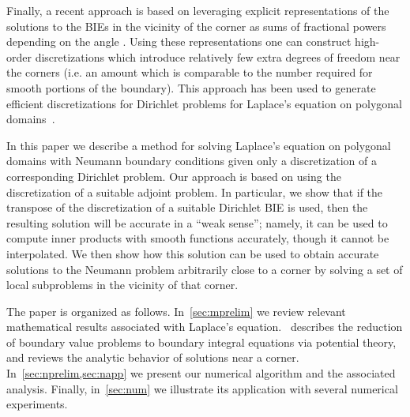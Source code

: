  Finally, a recent approach is based on leveraging explicit representations of the solutions to the BIEs in the vicinity of the corner as sums of fractional powers depending on the angle \cite{serkhacha,serkh2016solution}. Using these representations one can construct high-order discretizations which introduce relatively few extra degrees of freedom near the corners (i.e. an amount which is comparable to the number required for smooth portions of the boundary). This approach has been used to generate efficient discretizations for Dirichlet problems for Laplace's equation on polygonal domains~\cite{hoskins2019numerical}. 
 
 In this paper we describe a method for solving Laplace's equation on polygonal domains with Neumann boundary conditions given only a discretization of a corresponding Dirichlet problem. Our approach is based on using the discretization of a suitable adjoint problem. In particular, we show that if the transpose of the discretization of a suitable Dirichlet BIE is used, then the resulting solution will be accurate in a ``weak sense''; namely, it can be used to compute inner products with smooth functions accurately, though it cannot be interpolated. We then show how this solution can be used to obtain accurate solutions to the Neumann problem arbitrarily close to a corner by solving a set of local subproblems in the vicinity of that corner. 
 
 The paper is organized as follows. In~\cref{sec:mprelim} we review relevant mathematical results associated with Laplace's equation.~ describes the reduction of boundary value problems to boundary integral equations via potential theory, and reviews the analytic behavior of solutions near a corner. In~\cref{sec:nprelim,sec:napp} we present our numerical algorithm and the associated analysis. Finally, in~\cref{sec:num} we illustrate its application with several numerical experiments.

